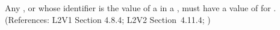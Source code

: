 Any \Compartment, \Species or \Parameter whose identifier is the value of a
  in a \RateRule, must have a value of 
for .  (References: L2V1 Section 4.8.4; L2V2 Section~4.11.4;
)

